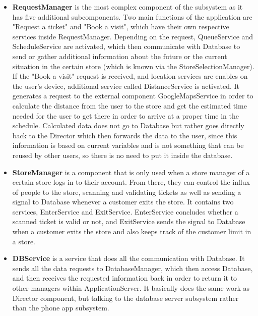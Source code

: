 \begin{itemize}
\newpage

\item \textbf{RequestManager} is the most complex component of the subsystem as it has five additional subcomponents. Two main functions of the application are "Request a ticket" and "Book a visit", which have their own respective services inside RequestManager. Depending on the request, QueueService and ScheduleService are activated, which then communicate with Database to send or gather additional information about the future or the current situation in the certain store (which is known via the StoreSelectionManager). If the "Book a visit" request is received, and location services are enables on the user's device, additional service called DistanceService is activated. It generates a request to the external component GoogleMapsService in order to calculate the distance from the user to the store and get the estimated time needed for the user to get there in order to arrive at a proper time in the schedule. Calculated data does not go to Database but rather goes directly back to the Director which then forwards the data to the user, since this information is based on current variables and is not something that can be reused by other users, so there is no need to put it inside the database.  

\item \textbf{StoreManager} is a component that is only used when a store manager of a certain store logs in to their account. From there, they can control the influx of people to the store, scanning and validating tickets as well as sending a signal to Database whenever a customer exits the store. It contains two services, EnterService and ExitService. EnterService concludes whether a scanned ticket is valid or not, and ExitService sends the signal to Database when a customer exits the store and also keeps track of the customer limit in a store. 

\item \textbf{DBService} is a service that does all the communication with Database. It sends all the data requests to DatabaseManager, which then access Database, and then receives the requested information back in order to return it to other managers within ApplicationServer. It basically does the same work as Director component, but talking to the database server subsystem rather than the phone app subsystem.
\end{itemize}


\newpage
